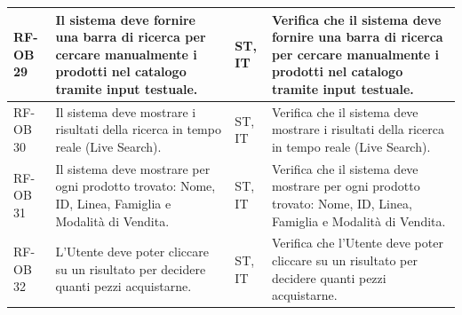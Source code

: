 \documentclass[a4paper,11pt,oneside]{scrartcl}
\begin{document}
\begin{longtable}{|p{1.5cm}|p{4.5cm}|p{1.8cm}|p{6cm}|}
    RF-OB 29         & Il sistema deve fornire una barra di ricerca per cercare manualmente i prodotti nel catalogo tramite input testuale.                                                                                                                                                                                  & ST, IT             & Verifica che il sistema deve fornire una barra di ricerca per cercare manualmente i prodotti nel catalogo tramite input testuale.                                                                                                                                                                                  \\ \hline
    RF-OB 30         & Il sistema deve mostrare i risultati della ricerca in tempo reale (Live Search).                                                                                                                                                                                                                      & ST, IT             & Verifica che il sistema deve mostrare i risultati della ricerca in tempo reale (Live Search).                                                                                                                                                                                                                      \\ \hline
    RF-OB 31         & Il sistema deve mostrare per ogni prodotto trovato: Nome, ID, Linea, Famiglia e Modalità di Vendita.                                                                                                                                                                                                  & ST, IT             & Verifica che il sistema deve mostrare per ogni prodotto trovato: Nome, ID, Linea, Famiglia e Modalità di Vendita.                                                                                                                                                                                                  \\ \hline
    RF-OB 32         & L'Utente deve poter cliccare su un risultato per decidere quanti pezzi acquistarne.                                                                                                                                                                                                                   & ST, IT             & Verifica che l'Utente deve poter cliccare su un risultato per decidere quanti pezzi acquistarne.                                                                                                                                                                                                                   \\ \hline

\end{longtable}
\end{document}
